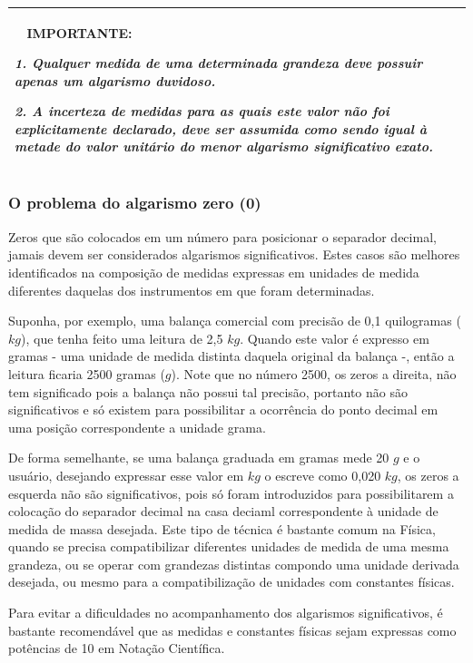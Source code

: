 \documentclass[a4paper, 11pt]{report}
\newenvironment{myboxed}
    {
        \begin{center}
        \begin{tabular}{p{0.7\textwidth}}
        \hline\
    }
    { 
        \\\hline
        \end{tabular} 
        \end{center}
    }
\begin{document}
\begin{myboxed}
    \textbf{IMPORTANTE:}

    \emph{
    1. Qualquer medida de uma determinada grandeza deve possuir apenas um 
    algarismo duvidoso.
    }

    \emph{
    2. A incerteza de medidas para as quais este valor não foi explicitamente 
    declarado, deve ser assumida como sendo igual à metade do valor unitário do
    menor algarismo significativo exato.
    }
\end{myboxed}

\subsubsection{O problema do algarismo zero (0)}
Zeros que são colocados em um número para posicionar o separador decimal, jamais
devem ser considerados algarismos significativos. Estes casos são melhores 
identificados na composição de medidas expressas em unidades de medida 
diferentes daquelas dos instrumentos em que foram determinadas.

Suponha, por exemplo, uma balança comercial com precisão de 0,1 quilogramas 
($kg$), que tenha feito uma leitura de 2,5 $kg$. Quando este valor é expresso em
gramas - uma unidade de medida distinta daquela original da balança -, então a 
leitura ficaria 2500 gramas ($g$). Note que no número 2500, os zeros a direita, 
não tem significado pois a balança não possui tal precisão, portanto não são 
significativos e só existem para possibilitar a ocorrência do ponto decimal 
em uma posição correspondente a unidade grama.

De forma semelhante, se uma balança graduada em gramas mede 20 $g$ e o 
usuário, desejando expressar esse valor em $kg$ o escreve como 0,020 $kg$, os 
zeros a esquerda não são significativos, pois só foram introduzidos para 
possibilitarem a colocação do separador decimal na casa deciaml correspondente 
à unidade de medida de massa desejada. Este tipo de técnica é bastante comum na 
Física, quando se precisa compatibilizar diferentes unidades de medida de uma 
mesma grandeza, ou se operar com grandezas distintas compondo uma unidade 
derivada desejada, ou mesmo para a compatibilização de unidades com constantes 
físicas. 

Para evitar a dificuldades no acompanhamento dos algarismos significativos, é 
bastante recomendável que as medidas e constantes físicas sejam expressas como 
potências de 10 em Notação Científica. 
\end{document}
